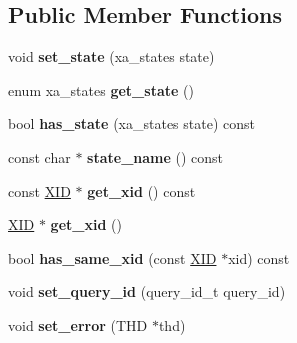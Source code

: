 \subsection*{Public Member Functions}
\begin{DoxyCompactItemize}
\item 
\mbox{\label{classXID__STATE_a5fb6a02c6f104f8c0a97f0fd079e2586}} 
void {\bfseries set\+\_\+state} (xa\+\_\+states state)
\item 
\mbox{\label{classXID__STATE_a8f25d63ee09eff39230cde444041ca31}} 
enum xa\+\_\+states {\bfseries get\+\_\+state} ()
\item 
\mbox{\label{classXID__STATE_a5500f3f4d429eb90a27f2b09173827aa}} 
bool {\bfseries has\+\_\+state} (xa\+\_\+states state) const
\item 
\mbox{\label{classXID__STATE_a3151a2309f51123b87ff923648ae3b77}} 
const char $\ast$ {\bfseries state\+\_\+name} () const
\item 
\mbox{\label{classXID__STATE_aff75cdf71a32a214f28bd6142e914e57}} 
const \mbox{\hyperlink{structxid__t}{X\+ID}} $\ast$ {\bfseries get\+\_\+xid} () const
\item 
\mbox{\label{classXID__STATE_a18e584e6f57eb9dc005cd8d85e2b0d88}} 
\mbox{\hyperlink{structxid__t}{X\+ID}} $\ast$ {\bfseries get\+\_\+xid} ()
\item 
\mbox{\label{classXID__STATE_ac62db6387dbc7244be4cb26a35dbc793}} 
bool {\bfseries has\+\_\+same\+\_\+xid} (const \mbox{\hyperlink{structxid__t}{X\+ID}} $\ast$xid) const
\item 
\mbox{\label{classXID__STATE_a2f1010fe6c122f1c48e7c3f2353815e9}} 
void {\bfseries set\+\_\+query\+\_\+id} (query\+\_\+id\+\_\+t query\+\_\+id)
\item 
\mbox{\label{classXID__STATE_ad64d5cb9a6e2da44fdea17e95ead2d6e}} 
void {\bfseries set\+\_\+error} (T\+HD $\ast$thd)
\item 
\mbox{\label{classXID__STATE_a39aca9b8eb3a0f6b7aabf3ce51f5dc61}} 

\end{DoxyCompactItemize}
